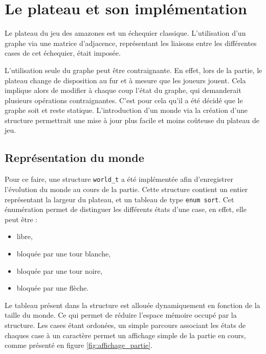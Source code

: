 \chapter{Le plateau et son implémentation}
Le plateau du jeu des amazones est un échequier classique. L'utilisation d'un graphe via une matrice d'adjacence, représentant les liaisons entre les différentes cases de cet échequier, était imposée. 

L'utilisation seule du graphe peut être contraignante. En effet, lors de la partie, le plateau change de disposition au fur et à mesure que les joueurs jouent. Cela implique alors de modifier à chaque coup l'état du graphe, qui demanderait plusieurs opérations contraignantes. C'est pour cela qu'il a été décidé que le graphe soit et reste statique. L'introduction d'un monde via la création d'une structure permettrait une mise à jour plus facile et moins coûteuse du plateau de jeu.  
\section{Représentation du monde}

Pour ce faire, une structure \texttt{world\_t} a été implémentée afin d'enregistrer l'évolution du monde au cours de la partie. Cette structure contient un entier représentant la largeur du plateau, et un tableau de type \texttt{enum sort}. Cet énumération permet de distinguer les différents états d'une case, en effet, elle peut être :
\begin{itemize}
    \item libre,
    \item bloquée par une tour blanche,
    \item bloquée par une tour noire,
    \item bloquée par une flèche.
\end{itemize}

\bigbreak


Le tableau présent dans la structure est allouée dynamiquement en fonction de la taille du monde. Ce qui permet de réduire l'espace mémoire occupé par la structure. Les cases étant ordonées, un simple parcours associant les états de chaques case à un caractère permet un affichage simple de la partie en cours, comme présenté en figure \ref{fig:affichage_partie}. 

